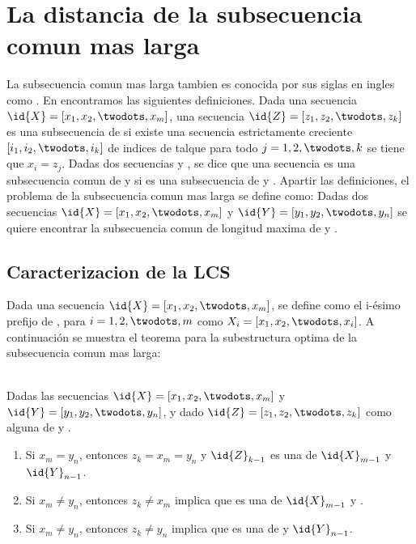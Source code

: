 \section{La distancia de la subsecuencia comun mas larga}
La subsecuencia comun mas larga tambien es conocida por sus siglas en ingles como . En \cite{Cormen2009} encontramos las siguientes definiciones. Dada una secuencia $\id{X} = [x_1, x_2, \twodots, x_m]$, una secuencia $\id{Z} = [z_1, z_2, \twodots, z_k]$ es una subsecuencia de  si existe una secuencia estrictamente creciente $[i_1,i_2,\twodots,i_k]$ de indices de  talque para todo $j=1,2,\twodots,k$ se tiene que $x_i = z_j$. Dadas dos secuencias  y , se dice que una secuencia  es una subsecuencia comun de  y  si  es una subsecuencia de  y . Apartir las definiciones, el problema de la subsecuencia comun mas larga se define como: Dadas dos secuencias $\id{X} =[x_1, x_2, \twodots, x_m]$ y $\id{Y} = [y_1, y_2, \twodots, y_n]$ se quiere encontrar la subsecuencia comun de longitud maxima de  y .

\subsection{Caracterizacion de la LCS}
Dada una secuencia $\id{X} = [x_1, x_2, \twodots, x_m]$, se define como el i-ésimo prefijo de , para $i=1,2,\twodots,m$ como $X_i=[x_1,x_2,\twodots,x_i]$. A continuación se muestra el teorema para la subestructura optima de la subsecuencia comun mas larga:

\begin{theorem}\ \\
\label{LCS}
Dadas las secuencias $\id{X}=[x_1,x_2,\twodots,x_m]$ y $\id{Y}=[y_1,y_2,\twodots,y_n]$, y dado $\id{Z}=[z_1,z_2,\twodots,z_k]$ como alguna  de  y .
\begin{enumerate}
    \item Si $x_m = y_n$, entonces $z_k = x_m = y_n$ y $\id{Z}_{k-1}$ es una  de $\id{X}_{m-1}$ y $\id{Y}_{n-1}$.
    \item Si $x_m \neq y_n$, entonces $z_k \neq x_m$ implica que  es una  de $\id{X}_{m-1}$ y .
    \item Si $x_m \neq y_n$, entonces $z_k \neq y_n$ implica que  es una  de  y $\id{Y}_{n-1}$.
\end{enumerate}
\end{theorem}

